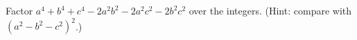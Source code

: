 Factor $a^4+b^4+c^4-2a^2b^2-2a^2c^2-2b^2c^2$ over the integers. (Hint: compare with $\left(a^2-b^2-c^2\right)^2$.)
